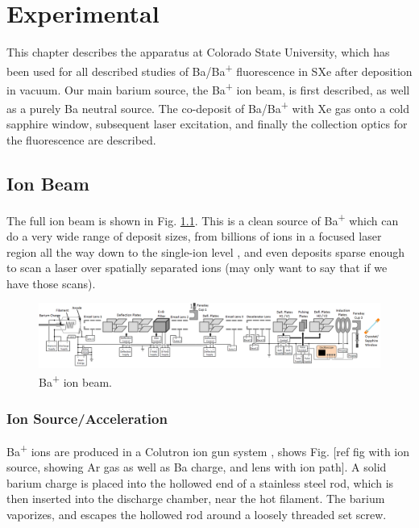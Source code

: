 \chapter{Experimental}

This chapter describes the apparatus at Colorado State University, which has been used for all described studies of Ba/Ba\textsuperscript{+} fluorescence in SXe after deposition in vacuum.  Our main barium source, the Ba\textsuperscript{+} ion beam, is first described, as well as a purely Ba neutral source.  The co-deposit of Ba/Ba\textsuperscript{+} with Xe gas onto a cold sapphire window, subsequent laser excitation, and finally the collection optics for the fluorescence are described.

\section{Ion Beam}

The full ion beam is shown in Fig. \ref{fig:ionbeam}.  This is a clean source of Ba\textsuperscript{+} which can do a very wide range of deposit sizes, from billions of ions in a focused laser region all the way down to the single-ion level {\color{gray}, and even deposits sparse enough to scan a laser over spatially separated ions (may only want to say that if we have those scans)}.

\begin{figure} %
        \centering
                \includegraphics[angle=90,width=.25\textwidth]{figures/ionBeam.png}
                \caption{Ba\textsuperscript{+} ion beam.}
\label{fig:ionbeam}
\end{figure}

\subsection{Ion Source/Acceleration}

Ba\textsuperscript{+} ions are produced in a Colutron ion gun system \cite{Colutron}, shows Fig. [ref fig with ion source, showing Ar gas as well as Ba charge, and lens with ion path].  A solid barium charge is placed into the hollowed end of a stainless steel rod, which is then inserted into the discharge chamber, near the hot filament.  The barium vaporizes, and escapes the hollowed rod around a loosely threaded set screw.

